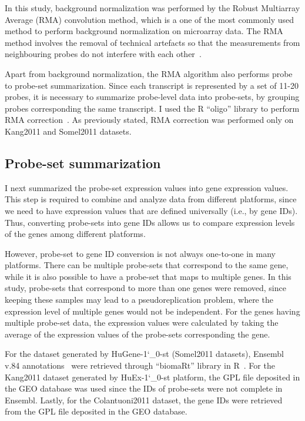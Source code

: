 In this study, background normalization was performed by the Robust Multiarray Average (RMA) convolution method, 
which is a one of the most commonly used method to perform background normalization on microarray data. 
The RMA method involves the removal of technical artefacts so that the measurements from neighbouring probes do not interfere with each other~\cite{Irizarry2003}.

Apart from background normalization, the RMA algorithm also performs probe to probe-set summarization. 
Since each transcript is represented by a set of 11-20 probes, it is necessary to summarize probe-level data into probe-sets, 
by grouping probes corresponding the same transcript. I used the R ``oligo'' library to perform RMA correction~\cite{Carvalho2010}.
As previously stated, RMA correction was performed only on Kang2011 and Somel2011 datasets.

\subsection{Probe-set summarization}
I next summarized the probe-set expression values into gene expression values. 
This step is required to combine and analyze data from different platforms, since we need to have expression values that are defined universally (i.e., by gene IDs).
Thus, converting probe-sets into gene IDs allows us to compare expression levels of the genes among different platforms.

However, probe-set to gene ID conversion is not always one-to-one in many platforms. 
There can be multiple probe-sets that correspond to the same gene, while it is also possible to have a probe-set that maps to multiple genes. 
In this study, probe-sets that correspond to more than one genes were removed, since keeping these samples may lead to a pseudoreplication problem, 
where the expression level of multiple genes would not be independent. 
For the genes having multiple probe-set data, the expression values were calculated by taking the average of the expression values of the probe-sets corresponding the gene.

For the dataset generated by HuGene-1\char`_0-st (Somel2011 datasets), 
Ensembl v.84 annotations~\cite{Yates2016} were retrieved through ``biomaRt'' library in R~\cite{Durinck2009}.
For the Kang2011 dataset generated by HuEx-1\char`_0-st platform, the GPL file deposited in the GEO database was used since the IDs of probe-sets were not complete in Ensembl.
Lastly, for the Colantuoni2011 dataset, the gene IDs were retrieved from the GPL file deposited in the GEO database.

